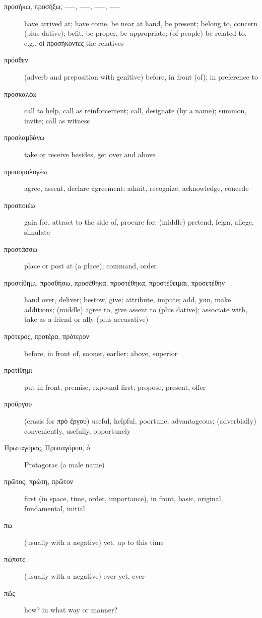\documentclass[12pt,letterpaper]{article}
\begin{document}
\begin{description}
    \item[\textgreek{προσήκω, προσήξω, –––, –––, –––, –––}] \marginnote{*}have arrived at; have come, be near at hand, be present; belong to, concern (plus dative); befit, be proper, be appropriate; (of people) be related to, e.g., \textgreek{οἱ προσήκοντες} the relatives
    \item[\textgreek{πρόσθεν}] (adverb and preposition with genitive) before, in front (of); in preference to
    \item[\textgreek{προσκαλέω}] call to help, call as reinforcement; call, designate (by a name); summon, invite; call as witness
    \item[\textgreek{προσλαμβάνω}] take or receive besides, get over and above
    \item[\textgreek{προσομολογέω}] agree, assent, declare agreement; admit, recognize, acknowledge, concede
    \item[\textgreek{προσποιέω}] gain for, attract to the side of, procure for; (middle) pretend, feign, allege, simulate
    \item[\textgreek{προστάσσω}] place or post at (a place); command, order
    \item[\textgreek{προστίθημι, προσθήσω, προσέθηκα, προστέθηκα, προστέθειμαι, προσετέθην}] \marginnote{*}hand over, deliver; bestow, give; attribute, impute; add, join, make additions; (middle) agree to, give assent to (plus dative); associate with, take as a friend or ally (plus accusative)
    \item[\textgreek{πρότερος, προτέρα, πρότερον}] \marginnote{*}before, in front of, sooner, earlier; above, superior
    \item[\textgreek{προτίθημι}] put in front, premise, expound first; propose, present, offer
    \item[\textgreek{προὔργου}] (crasis for \textgreek{πρὸ ἔργου}) useful, helpful, poortune, advantageous; (adverbially) conveniently, usefully, opportunely
    \item[\textgreek{Πρωταγόρας, Πρωταγόρου, ὁ}] Protagoras (a male name)
    \item[\textgreek{πρῶτος, πρώτη, πρῶτον}] \marginnote{*}first (in space, time, order, importance), in front, basic, original, fundamental, initial
    \item[\textgreek{πω}] (usually with a negative) yet, up to this time
    \item[\textgreek{πώποτε}] (usually with a negative) ever yet, ever
    \item[\textgreek{πῶς}] \marginnote{*}how? in what way or manner?

\end{description}
\end{document}
